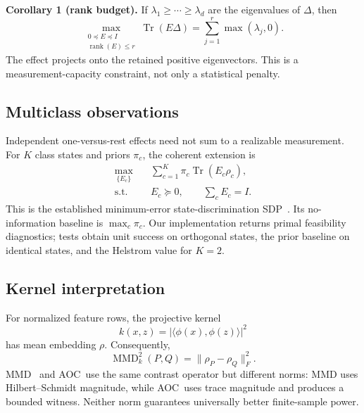 \documentclass[letterpaper,journal]{IEEEtran}
\newcommand{\Tr}{\operatorname{Tr}}
\newcommand{\rank}{\operatorname{rank}}
\newcommand{\AOC}{\textsc{AOC}}
\begin{document}
\textbf{Corollary 1 (rank budget).}
If $\lambda_1\geq\cdots\geq\lambda_d$ are the eigenvalues of $\Delta$, then
\begin{equation}
\max_{\substack{0\preceq E\preceq I\\\rank(E)\leq r}}\Tr(E\Delta)
=\sum_{j=1}^r\max(\lambda_j,0).                     \label{eq:kyfan}
\end{equation}
The effect projects onto the retained positive eigenvectors. This is a
measurement-capacity constraint, not only a statistical penalty.

\subsection{Multiclass observations}

Independent one-versus-rest effects need not sum to a realizable measurement.
For $K$ class states and priors $\pi_c$, the coherent extension is
\begin{equation}
\begin{aligned}
\max_{\{E_c\}}\quad&
\sum_{c=1}^K\pi_c\Tr(E_c\rho_c),\\
\text{s.t.}\quad&E_c\succeq0,\qquad\sum_cE_c=I.     \label{eq:povm}
\end{aligned}
\end{equation}
This is the established minimum-error state-discrimination SDP~\cite{holevo2011}.
Its no-information baseline is $\max_c\pi_c$. Our implementation returns
primal feasibility diagnostics; tests obtain unit success on orthogonal
states, the prior baseline on identical states, and the Helstrom value for
$K=2$.

\subsection{Kernel interpretation}

For normalized feature rows, the projective kernel
\begin{equation}
k(x,z)=|\langle\phi(x),\phi(z)\rangle|^2
\end{equation}
has mean embedding $\rho$. Consequently,
\begin{equation}
\operatorname{MMD}_k^2(P,Q)=\|\rho_P-\rho_Q\|_F^2.  \label{eq:mmd}
\end{equation}
MMD~\cite{gretton2012} and \AOC\ use the same contrast operator but different
norms: MMD uses Hilbert--Schmidt magnitude, while \AOC\ uses trace magnitude
and produces a bounded witness. Neither norm guarantees universally better
finite-sample power.
\end{document}
